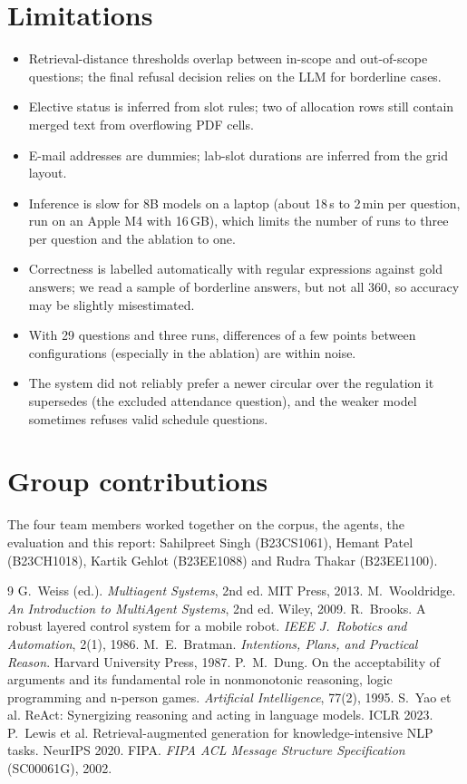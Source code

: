 \documentclass[11pt,a4paper]{article}
\begin{document}
\section{Limitations}
\begin{itemize}
\item Retrieval-distance thresholds overlap between in-scope and out-of-scope questions; the final refusal
      decision relies on the LLM for borderline cases.
\item Elective status is inferred from slot rules; two of \numCourses{} allocation rows still contain
      merged text from overflowing PDF cells.
\item E-mail addresses are dummies; lab-slot durations are inferred from the grid layout.
\item Inference is slow for 8B models on a laptop (about 18\,s to 2\,min per question, run on an Apple M4
      with 16\,GB), which limits the number of runs to three per question and the ablation to one.
\item Correctness is labelled automatically with regular expressions against gold answers; we read a sample
      of borderline answers, but not all 360, so accuracy may be slightly misestimated.
\item With 29 questions and three runs, differences of a few points between configurations (especially in the
      ablation) are within noise.
\item The system did not reliably prefer a newer circular over the regulation it supersedes (the excluded
      attendance question), and the weaker model sometimes refuses valid schedule questions.
\end{itemize}

\section{Group contributions}
The four team members worked together on the corpus, the agents, the evaluation and this report:
Sahilpreet Singh (B23CS1061), Hemant Patel (B23CH1018), Kartik Gehlot (B23EE1088) and
Rudra Thakar (B23EE1100).

\begin{thebibliography}{9}
 G.~Weiss (ed.). \emph{Multiagent Systems}, 2nd ed. MIT Press, 2013.
 M.~Wooldridge. \emph{An Introduction to MultiAgent Systems}, 2nd ed. Wiley, 2009.
 R.~Brooks. A robust layered control system for a mobile robot. \emph{IEEE J.\ Robotics and Automation}, 2(1), 1986.
 M.~E.~Bratman. \emph{Intentions, Plans, and Practical Reason}. Harvard University Press, 1987.
 P.~M.~Dung. On the acceptability of arguments and its fundamental role in nonmonotonic reasoning, logic programming and n-person games. \emph{Artificial Intelligence}, 77(2), 1995.
 S.~Yao et al. ReAct: Synergizing reasoning and acting in language models. ICLR 2023.
 P.~Lewis et al. Retrieval-augmented generation for knowledge-intensive NLP tasks. NeurIPS 2020.
 FIPA. \emph{FIPA ACL Message Structure Specification} (SC00061G), 2002.
\end{thebibliography}
\end{document}
